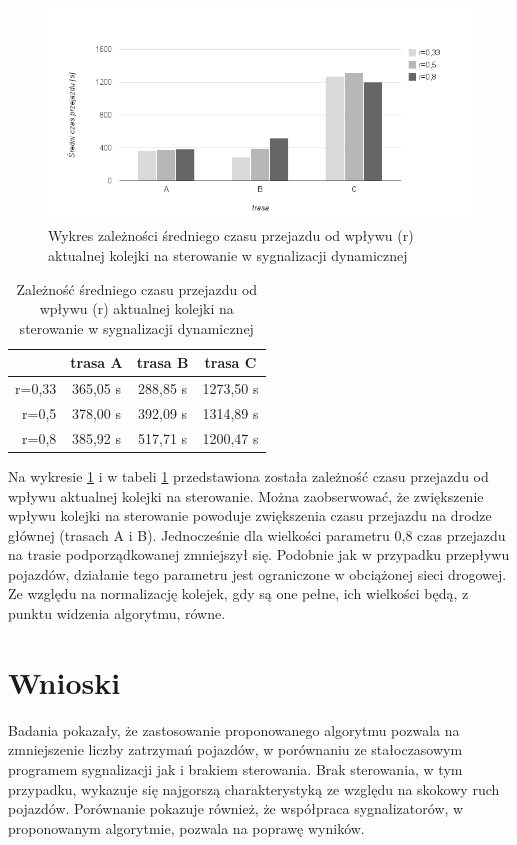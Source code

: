 \FloatBarrier
\begin{figure}[h]
    \centering
    \includegraphics[width=1.0\textwidth]{images/wykres_kolejka_czas.png}
    \caption{Wykres zależności średniego czasu przejazdu od wpływu (r) aktualnej kolejki na sterowanie w sygnalizacji dynamicznej}
    \label{fig:wykres_kolejka_czas}
\end{figure}
\FloatBarrier
\begin{table}[h]
	\centering
	\begin{tabular}{ |r|c|c|c| }
		\hline
		& trasa A & trasa B & trasa C \\
		\hline
		r=0,33 & 365,05 s & 288,85 s & 1273,50 s \\
		\hline
		r=0,5 & 378,00 s & 392,09 s & 1314,89 s \\
		\hline
		r=0,8 & 385,92 s & 517,71 s & 1200,47 s \\
		\hline
	\end{tabular}
	\caption{Zależność średniego czasu przejazdu od wpływu (r) aktualnej kolejki na sterowanie w sygnalizacji dynamicznej}
	\label{tab:wykres_kolejka_czas}
\end{table}
\FloatBarrier
Na wykresie \ref{fig:wykres_kolejka_czas} i w tabeli \ref{tab:wykres_kolejka_czas} przedstawiona została zależność czasu przejazdu od wpływu aktualnej kolejki na sterowanie. Można zaobserwować, że zwiększenie wpływu kolejki na sterowanie powoduje zwiększenia czasu przejazdu na drodze głównej (trasach A i B). Jednocześnie dla wielkości parametru 0,8 czas przejazdu na trasie podporządkowanej zmniejszył się.
Podobnie jak w przypadku przepływu pojazdów, działanie tego parametru jest ograniczone w obciążonej sieci drogowej. Ze względu na normalizację kolejek, gdy są one pełne, ich wielkości będą, z punktu widzenia algorytmu, równe.

\section{Wnioski}
Badania pokazały, że zastosowanie proponowanego algorytmu pozwala na zmniejszenie liczby zatrzymań pojazdów, w porównaniu ze stałoczasowym programem sygnalizacji jak i brakiem sterowania. Brak sterowania, w tym przypadku, wykazuje się najgorszą charakterystyką ze względu na skokowy ruch pojazdów. Porównanie pokazuje również, że współpraca sygnalizatorów, w proponowanym algorytmie, pozwala na poprawę wyników.

